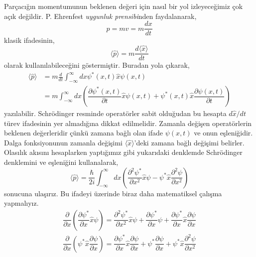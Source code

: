 \documentclass[00_kitap.tex]{subfiles}
\begin{document}
Parçacığın momentumunun beklenen değeri için nasıl bir yol izleyeceğimiz çok açık değildir. P. Ehrenfest \emph{uygunluk prensibi}nden faydalanarak,
\begin{equation*}
p = m v = m\frac{dx}{dt}
\end{equation*}
klasik ifadesinin,
\begin{equation*}
\langle \hat p \rangle = m\frac{d \langle \hat x \rangle}{dt}
\end{equation*}
olarak kullanılabileceğini göstermiştir. Buradan yola çıkarak,
\begin{align}
\langle \hat p \rangle &= m \frac{d}{dt} \int ^{\infty }_{-\infty }dx \psi^{\ast }\left(x,t\right) \hat x \psi \left( x,t\right)\\
&=m\int ^{\infty }_{-\infty }dx\left( \dfrac {\partial \psi ^{\ast }\left( x,t\right) }{\partial t} \hat x\psi \left( x,t\right) +\psi ^{\ast }\left( x,t\right) \hat x \dfrac {\partial \psi \left( x,t\right) }{\partial t}\right) \nonumber 
\end{align}
yazılabilir. Schrödinger resminde operatörler sabit olduğudan bu hesapta $d \hat x/dt$ türev ifadesinin yer almadığına dikkat edilmelidir. Zamanla değişen operatörlerin beklenen değerleridir çünkü zamana bağlı olan ifade $\psi(x,t)$ ve onun eşleniğidir. Dalga fonksiyonunun zamanla değişimi $\langle \hat x \rangle$'deki zamana bağlı değişimi belirler. Olasılık akısını hesaplarken yaptığımız gibi yukarıdaki denklemde Schrödinger denklemini ve eşleniğini kullanalarak,
\begin{equation}
\langle \hat p\rangle =\dfrac {\hbar }{2i}\int ^{\infty }_{-\infty }dx\left( \dfrac {\partial ^{2}\psi ^{\ast }}{\partial x^{2}}\hat x\psi -\psi ^{\ast } \hat x\dfrac {\partial ^{2}\psi }{\partial x^{2}}\right)
\label{eq:expectation_val_p_1}
\end{equation}
sonucuna ulaşırız. Bu ifadeyi üzerinde biraz daha matematiksel çalışma yapmalıyız.
\begin{align*}
\dfrac {\partial }{\partial x}\left( \dfrac {\partial \psi ^{\ast }}{\partial x} \hat x\psi \right) =\dfrac {\partial ^{2}\psi^{\ast }}{\partial x^{2}}\hat x\psi +\dfrac {\partial \psi ^{\ast }}{\partial x}\psi +\dfrac {\partial \psi ^{\ast }}{\partial x}\hat x\dfrac {\partial \psi }{\partial x} \\
\dfrac {\partial }{\partial x}\left( \psi ^{\ast }\hat x\dfrac {\partial \psi }{\partial x}\right) =\dfrac {\partial \psi ^{\ast }}{\partial x}\hat x\dfrac {\partial \psi }{\partial x}+\psi ^{\ast }\dfrac {\partial \psi }{\partial x} + \psi ^{\ast } \hat x \dfrac {\partial ^{2}\psi }{\partial x^{2}}
\end{align*}
\end{document}
